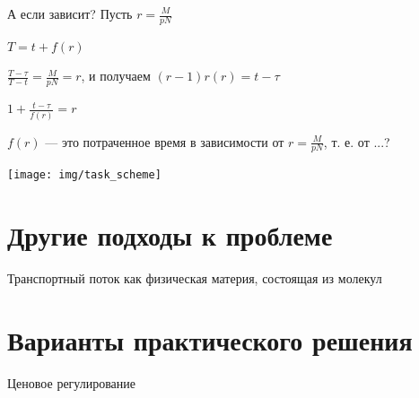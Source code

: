 А если зависит? Пусть $r = \frac{M}{pN}$

$T = t + f(r)$

$\frac{T-\tau}{T-t} = \frac{M}{pN} = r$, и получаем $(r-1)r(r) = t - \tau$

$1 + \frac{t-\tau}{f(r)} = r$

$f(r)$ --- это потраченное время в зависимости от $r = \frac{M}{pN}$, т. е. от ...?





\bigskip

\texttt{[image: img/task\_scheme]}



\section{Другие подходы к проблеме}
Транспортный поток как физическая материя, состоящая из молекул \cite[168]{lukanin}
\section{Варианты практического решения}
Ценовое регулирование
